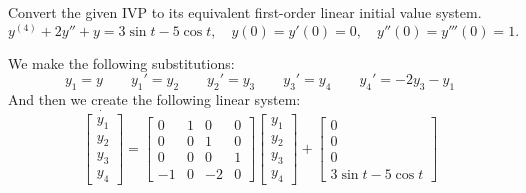 Convert the given IVP to its equivalent first-order linear initial value system. 
$$y^{(4)} + 2y'' + y = 3 \sin t - 5 \cos t, \quad y(0) = y'(0) = 0, \quad y''(0) = y'''(0) = 1.$$

\soln We make the following substitutions: 
$$y_1 = y \qquad y_1' = y_2 \qquad y_2' = y_3 \qquad y_3' = y_4 \qquad y_4' = -2y_3 -y_1$$
And then we create the following linear system:
$$\dot{\begin{bmatrix}
    y_1 \\ y_2 \\ y_3 \\ y_4
\end{bmatrix}} = \begin{bmatrix}
    0 & 1 & 0 & 0 \\ 0&0&1&0 \\ 0&0&0&1 \\ -1&0&-2&0
\end{bmatrix} \begin{bmatrix}
    y_1 \\ y_2 \\ y_3 \\ y_4
\end{bmatrix} + \begin{bmatrix}
    0 \\ 0 \\ 0 \\ 3\sin t - 5 \cos t
\end{bmatrix}$$